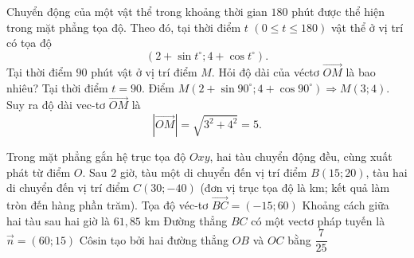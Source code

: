 \begin{bt}%
	Chuyển động của một vật thể trong khoảng thời gian $180$ phút được thể hiện trong mặt phẳng tọa độ. Theo đó, tại thời điểm $t$ $(0 \le t \le 180)$ vật thể ở vị trí có tọa độ $$(2 + \sin t^{\circ}; 4 + \cos t^{\circ}).$$
	Tại thời điểm $90$ phút vật ở vị trí điểm $M$. Hỏi độ dài của véctơ $\overrightarrow{OM}$ là bao nhiêu?
	\loigiai
	{
		Tại thời điểm $t = 90$. Điểm $M(2 + \sin 90^{\circ}; 4 + \cos 90^{\circ}) \Rightarrow M(3;4)$.\\
		Suy ra độ dài vec-tơ $\overrightarrow{OM}$ là $$\left|\overrightarrow{OM}\right| = \sqrt{3^2 + 4^2} = 5.$$
	}
\end{bt}

\begin{ex}%
	Trong mặt phẳng gắn hệ trục tọa độ $Oxy$, hai tàu chuyển động đều, cùng xuất phát từ điểm $O$. Sau $2$ giờ, tàu một di chuyển đến vị trí điểm $B\left(15;20\right)$, tàu hai di chuyển đến vị trí điểm $C\left(30;-40\right)$ (đơn vị trục tọa độ là km; kết quả làm tròn đến hàng phần trăm).
	\choiceTF
	{Tọa độ véc-tơ $\overrightarrow{BC}=(-15;60)$}
	{\True Khoảng cách giữa hai tàu sau hai giờ là $61{,}85$ km}
	{\True Đường thẳng $BC$ có một vectơ pháp tuyến là $\overrightarrow{n}=(60;15)$}
	{\True Côsin tạo bởi hai đường thẳng $OB$ và $OC$ bằng $\dfrac{7}{25}$}
\end{ex}

